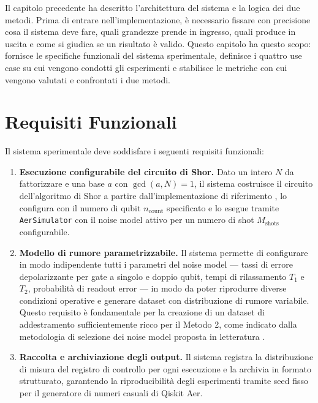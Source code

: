 \begin{onehalfspace}

Il capitolo precedente ha descritto l'architettura del sistema e la logica dei due metodi. Prima di entrare nell'implementazione, è necessario fissare con precisione cosa il sistema deve fare, quali grandezze prende in ingresso, quali produce in uscita e come si giudica se un risultato è valido. Questo capitolo ha questo scopo: fornisce le specifiche funzionali del sistema sperimentale, definisce i quattro use case su cui vengono condotti gli esperimenti e stabilisce le metriche con cui vengono valutati e confrontati i due metodi.

\section{Requisiti Funzionali}
\label{sec:requisiti}

Il sistema sperimentale deve soddisfare i seguenti requisiti funzionali:

\begin{enumerate}

    \item \textbf{Esecuzione configurabile del circuito di Shor.}
    Dato un intero $N$ da fattorizzare e una base $a$ con $\gcd(a, N) = 1$, il sistema costruisce il circuito dell'algoritmo di Shor a partire dall'implementazione di riferimento \cite{github_shor}, lo configura con il numero di qubit $n_{\text{count}}$ specificato e lo esegue tramite \texttt{AerSimulator} con il noise model attivo per un numero di shot $M_{\text{shots}}$ configurabile.

    \item \textbf{Modello di rumore parametrizzabile.}
    Il sistema permette di configurare in modo indipendente tutti i parametri del noise model --- tassi di errore depolarizzante per gate a singolo e doppio qubit, tempi di rilassamento $T_1$ e $T_2$, probabilità di readout error --- in modo da poter riprodurre diverse condizioni operative e generare dataset con distribuzione di rumore variabile. Questo requisito è fondamentale per la creazione di un dataset di addestramento sufficientemente ricco per il Metodo 2, come indicato dalla metodologia di selezione dei noise model proposta in letteratura \cite{epjqt_noise2024}.

    \item \textbf{Raccolta e archiviazione degli output.}
    Il sistema registra la distribuzione di misura del registro di controllo per ogni esecuzione e la archivia in formato strutturato, garantendo la riproducibilità degli esperimenti tramite seed fisso per il generatore di numeri casuali di Qiskit Aer.


\end{enumerate}
\end{onehalfspace}
